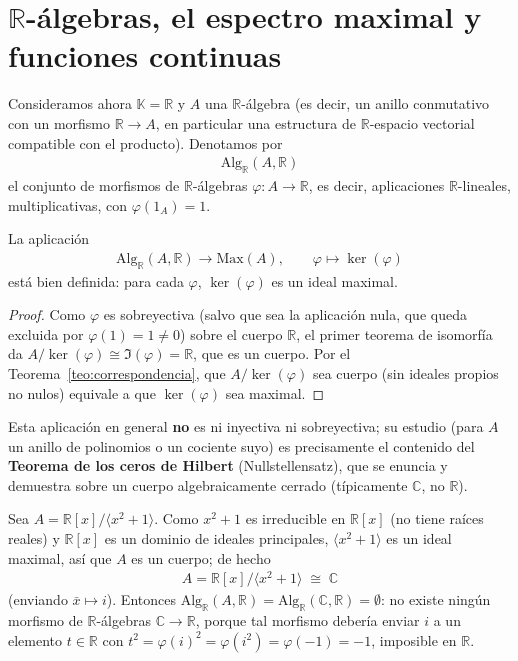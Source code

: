 \section{$\mathbb{R}$-álgebras, el espectro maximal y funciones continuas}

Consideramos ahora $\mathbb{K}=\mathbb{R}$ y $A$ una $\mathbb{R}$-álgebra (es decir, un anillo conmutativo con un morfismo $\mathbb{R}\to A$, en particular una estructura de $\mathbb{R}$-espacio vectorial compatible con el producto). Denotamos por
\begin{gather*}
    \mathrm{Alg}_{\mathbb{R}}(A,\mathbb{R})
\end{gather*}
el conjunto de morfismos de $\mathbb{R}$-álgebras $\varphi: A\to \mathbb{R}$, es decir, aplicaciones $\mathbb{R}$-lineales, multiplicativas, con $\varphi(1_A)=1$.

\begin{prop}
La aplicación
\begin{gather*}
    \mathrm{Alg}_{\mathbb{R}}(A,\mathbb{R}) \to \mathrm{Max}(A), \qquad \varphi \mapsto \ker(\varphi)
\end{gather*}
está bien definida: para cada $\varphi$, $\ker(\varphi)$ es un ideal maximal.
\end{prop}
\begin{proof}
Como $\varphi$ es sobreyectiva (salvo que sea la aplicación nula, que queda excluida por $\varphi(1)=1\neq 0$) sobre el cuerpo $\mathbb{R}$, el primer teorema de isomorfía da $A/\ker(\varphi) \cong \Im(\varphi) = \mathbb{R}$, que es un cuerpo. Por el Teorema~\ref{teo:correspondencia}, que $A/\ker(\varphi)$ sea cuerpo (sin ideales propios no nulos) equivale a que $\ker(\varphi)$ sea maximal.
\end{proof}

Esta aplicación en general \textbf{no} es ni inyectiva ni sobreyectiva; su estudio (para $A$ un anillo de polinomios o un cociente suyo) es precisamente el contenido del \textbf{Teorema de los ceros de Hilbert} (Nullstellensatz), que se enuncia y demuestra sobre un cuerpo algebraicamente cerrado (típicamente $\mathbb{C}$, no $\mathbb{R}$).

\begin{ejemplo}
Sea $A = \mathbb{R}[x]/\langle x^2 + 1 \rangle$. Como $x^2+1$ es irreducible en $\mathbb{R}[x]$ (no tiene raíces reales) y $\mathbb{R}[x]$ es un dominio de ideales principales, $\langle x^2+1\rangle$ es un ideal maximal, así que $A$ es un cuerpo; de hecho
\begin{gather*}
    A = \mathbb{R}[x]/\langle x^2+1\rangle \;\cong\; \mathbb{C}
\end{gather*}
(enviando $\bar x \mapsto i$). Entonces $\mathrm{Alg}_{\mathbb{R}}(A,\mathbb{R}) = \mathrm{Alg}_{\mathbb{R}}(\mathbb{C},\mathbb{R}) = \emptyset$: no existe ningún morfismo de $\mathbb{R}$-álgebras $\mathbb{C}\to \mathbb{R}$, porque tal morfismo debería enviar $i$ a un elemento $t\in \mathbb{R}$ con $t^2=\varphi(i)^2=\varphi(i^2)=\varphi(-1)=-1$, imposible en $\mathbb{R}$.
\end{ejemplo}

